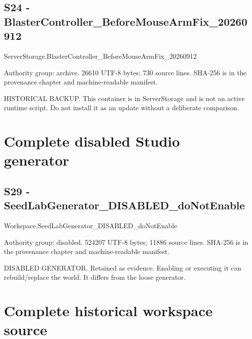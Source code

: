 \chapter{S24 - BlasterController\_\allowbreak{}BeforeMouseArmFix\_\allowbreak{}20260912}
\label{src:S24}
ServerStorage.\allowbreak{}BlasterController\_\allowbreak{}BeforeMouseArmFix\_\allowbreak{}20260912

Authority group: archive.\allowbreak{} 26610 UTF-8 bytes; 730 source lines.\allowbreak{} SHA-256 is in the provenance chapter and machine-readable manifest.\allowbreak{}

HISTORICAL BACKUP.\allowbreak{} This container is in ServerStorage and is not an active runtime script.\allowbreak{} Do not install it as an update without a deliberate comparison.\allowbreak{}

\begingroup{}
\endgroup
\part{Complete disabled Studio generator}
\chapter{S29 - SeedLabGenerator\_\allowbreak{}DISABLED\_\allowbreak{}doNotEnable}
\label{src:S29}
Workspace.\allowbreak{}SeedLabGenerator\_\allowbreak{}DISABLED\_\allowbreak{}doNotEnable

Authority group: disabled.\allowbreak{} 524207 UTF-8 bytes; 11886 source lines.\allowbreak{} SHA-256 is in the provenance chapter and machine-readable manifest.\allowbreak{}

DISABLED GENERATOR.\allowbreak{} Retained as evidence.\allowbreak{} Enabling or executing it can rebuild/\allowbreak{}replace the world.\allowbreak{} It differs from the loose generator.\allowbreak{}

\begingroup{}
\endgroup
\part{Complete historical workspace source}
